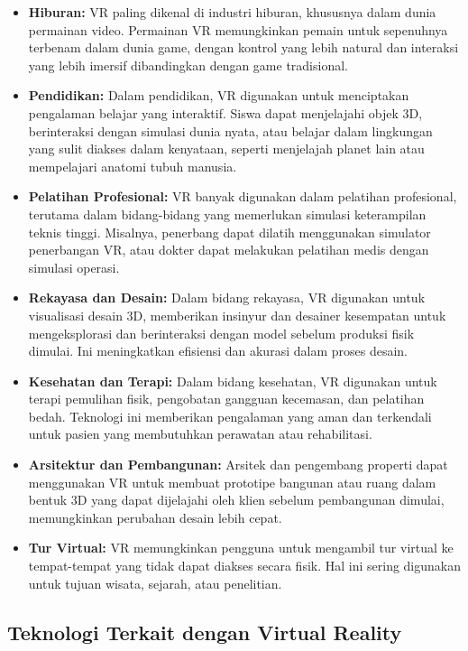 \begin{itemize}
    \item \textbf{Hiburan:} VR paling dikenal di industri hiburan, khususnya dalam dunia permainan video. Permainan VR memungkinkan pemain untuk sepenuhnya terbenam dalam dunia game, dengan kontrol yang lebih natural dan interaksi yang lebih imersif dibandingkan dengan game tradisional.
    \item \textbf{Pendidikan:} Dalam pendidikan, VR digunakan untuk menciptakan pengalaman belajar yang interaktif. Siswa dapat menjelajahi objek 3D, berinteraksi dengan simulasi dunia nyata, atau belajar dalam lingkungan yang sulit diakses dalam kenyataan, seperti menjelajah planet lain atau mempelajari anatomi tubuh manusia.
    \item \textbf{Pelatihan Profesional:} VR banyak digunakan dalam pelatihan profesional, terutama dalam bidang-bidang yang memerlukan simulasi keterampilan teknis tinggi. Misalnya, penerbang dapat dilatih menggunakan simulator penerbangan VR, atau dokter dapat melakukan pelatihan medis dengan simulasi operasi.
    \item \textbf{Rekayasa dan Desain:} Dalam bidang rekayasa, VR digunakan untuk visualisasi desain 3D, memberikan insinyur dan desainer kesempatan untuk mengeksplorasi dan berinteraksi dengan model sebelum produksi fisik dimulai. Ini meningkatkan efisiensi dan akurasi dalam proses desain.
    \item \textbf{Kesehatan dan Terapi:} Dalam bidang kesehatan, VR digunakan untuk terapi pemulihan fisik, pengobatan gangguan kecemasan, dan pelatihan bedah. Teknologi ini memberikan pengalaman yang aman dan terkendali untuk pasien yang membutuhkan perawatan atau rehabilitasi.
    \item \textbf{Arsitektur dan Pembangunan:} Arsitek dan pengembang properti dapat menggunakan VR untuk membuat prototipe bangunan atau ruang dalam bentuk 3D yang dapat dijelajahi oleh klien sebelum pembangunan dimulai, memungkinkan perubahan desain lebih cepat.
    \item \textbf{Tur Virtual:} VR memungkinkan pengguna untuk mengambil tur virtual ke tempat-tempat yang tidak dapat diakses secara fisik. Hal ini sering digunakan untuk tujuan wisata, sejarah, atau penelitian.
\end{itemize}

\subsection{Teknologi Terkait dengan Virtual Reality}
\label{subsec:teknologivrtk}

